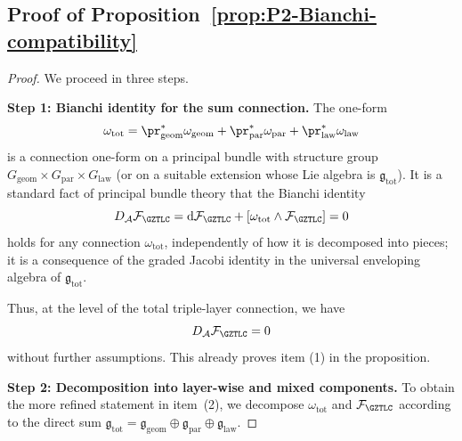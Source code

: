 \documentclass[11pt]{book}
\theoremstyle{plain}
\theoremstyle{definition}
\begin{document}
\subsection*{Proof of Proposition~\ref{prop:P2-Bianchi-compatibility}}


\begin{proof}
We proceed in three steps.

\medskip\noindent
\textbf{Step 1: Bianchi identity for the sum connection.}
The one-form
\[
  \omega_{\mathrm{tot}}
  =
  \pr_{\mathrm{geom}}^*\omega_{\mathrm{geom}}
  +
  \pr_{\mathrm{par}}^*\omega_{\mathrm{par}}
  +
  \pr_{\mathrm{law}}^*\omega_{\mathrm{law}}
\]
is a connection one-form on a principal bundle with structure group
\(G_{\mathrm{geom}}\times G_{\mathrm{par}}\times G_{\mathrm{law}}\)
(or on a suitable extension whose Lie algebra is
\(\mathfrak{g}_{\mathrm{tot}}\)).  It is a standard fact of principal
bundle theory that the Bianchi identity
\[
  D_{\mathcal{A}}\mathcal{F}_{\GZTLC}
  =
  \mathrm{d}\mathcal{F}_{\GZTLC}
  +
  [\omega_{\mathrm{tot}}\wedge\mathcal{F}_{\GZTLC}]
  = 0
\]
holds for any connection \(\omega_{\mathrm{tot}}\), independently of
how it is decomposed into pieces; it is a consequence of the graded
Jacobi identity in the universal enveloping algebra of
\(\mathfrak{g}_{\mathrm{tot}}\).

Thus, at the level of the total triple-layer connection, we have
\[
  D_{\mathcal{A}}\mathcal{F}_{\GZTLC}=0
\]
without further assumptions.  This already proves item
\textnormal{(1)} in the proposition.



\medskip\noindent
\textbf{Step 2: Decomposition into layer-wise and mixed components.}
To obtain the more refined statement in item~\textnormal{(2)}, we
decompose \(\omega_{\mathrm{tot}}\) and
\(\mathcal{F}_{\GZTLC}\) according to the direct sum
\(\mathfrak{g}_{\mathrm{tot}}
  = \mathfrak{g}_{\mathrm{geom}}
    \oplus\mathfrak{g}_{\mathrm{par}}
    \oplus\mathfrak{g}_{\mathrm{law}}\).


\end{proof}
\end{document}
